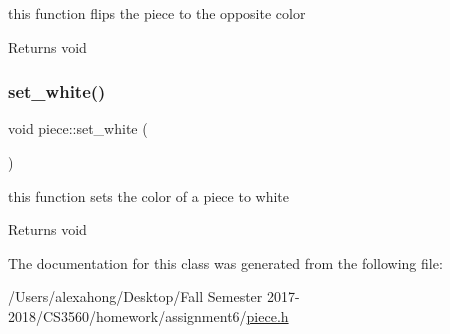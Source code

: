 this function flips the piece to the opposite color 

\begin{DoxyReturn}{Returns}
void 
\end{DoxyReturn}
\mbox{\label{classpiece_a31480899f2a591fdb22d97933303e19d}} 
\subsubsection{\texorpdfstring{set\+\_\+white()}{set\_white()}}
{\footnotesize\ttfamily void piece\+::set\+\_\+white (\begin{DoxyParamCaption}{ }\end{DoxyParamCaption})\hspace{0.3cm}{\ttfamily [inline]}}



this function sets the color of a piece to white 

\begin{DoxyReturn}{Returns}
void 
\end{DoxyReturn}


The documentation for this class was generated from the following file\+:\begin{DoxyCompactItemize}
\item 
/\+Users/alexahong/\+Desktop/\+Fall Semester 2017-\/2018/\+C\+S3560/homework/assignment6/\hyperlink{piece_8h}{piece.\+h}\end{DoxyCompactItemize}
